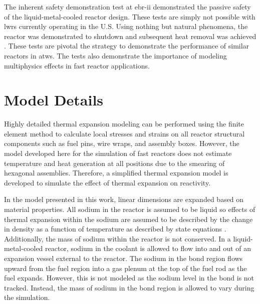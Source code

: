   The inherent safety demonstration test at \gls{ebr-ii} demonstrated the passive
  safety of the liquid-metal-cooled reactor design. These tests are simply not 
  possible with \glspl{lwr} currently operating in the U.S. 
  Using nothing but natural phenomena, the reactor was demonstrated to shutdown 
  and subsequent heat removal was achieved \cite{ebriitests}. These tests are 
  pivotal the strategy to demonstrate the performance of similar reactors in 
  \gls{atws}. The tests also demonstrate the importance of modeling multiphysics 
  effects in fast reactor applications.

\section{Model Details}
  \label{sec:model_details}
  Highly detailed thermal expansion modeling can be performed using the finite
  element method to calculate local stresses and strains on all reactor
  structural components such as fuel pins, wire wraps, and assembly boxes. 
  However, the model developed here for the simulation of
  fast reactors does not estimate temperature and heat generation at all 
  positions due to the smearing of hexagonal assemblies. Therefore, a simplified 
  thermal expansion model is developed to simulate the effect of thermal 
  expansion on reactivity.

  In the model presented in this work, linear dimensions are expanded based on 
  material properties.  All sodium in the reactor is assumed to be liquid so 
  effects of thermal expansion within the sodium are assumed to be described by 
  the change in density as a function of temperature as described by state 
  equations \cite{sodiumProp}. Additionally, the mass of sodium within the 
  reactor is not conserved. In a liquid-metal-cooled reactor, sodium in the 
  coolant is allowed to flow into and out of an expansion vessel external to the 
  reactor.  The sodium in the bond region flows upward from the fuel region into 
  a gas plenum at the top of the fuel rod as the fuel expands. However, this is 
  not modeled as the sodium level in the bond is not tracked. Instead, the mass 
  of sodium in the bond region is allowed to vary during the simulation.

